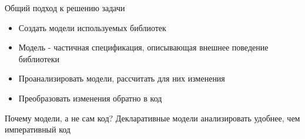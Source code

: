 \documentclass[12pt]{beamer}
\begin{document}
{
\begin{frame}{Общий подход к решению задачи}
\begin{mybox}[]
\begin{itemize}
	\item Создать модели используемых библиотек
	\item Модель - частичная спецификация, описывающая внешнее поведение библиотеки
	\item Проанализировать модели, рассчитать для них изменения
	\item Преобразовать изменения обратно в код
\end{itemize}
\end{mybox}

\begin{alertblock}{Почему модели, а не сам код?}
Декларативные модели анализировать удобнее, чем императивный код
\end{alertblock}
\end{frame}
}
\end{document}
